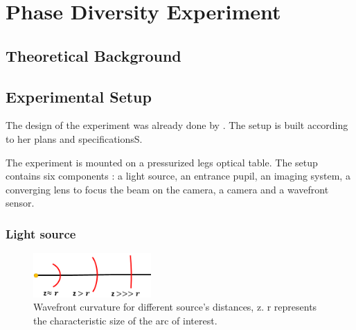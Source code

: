 \chapter{Phase Diversity Experiment} 

\label{PDExp}


\section{Theoretical Background}




\section{Experimental Setup}

The design of the experiment was already done by \citet{Bouxin_PDM}.  The setup is built according to her plans and specificationsS.

The experiment is mounted on a pressurized legs optical table. The setup contains six components : a light source, an entrance pupil, an imaging system, a converging lens to focus the beam on the camera, a camera and a wavefront sensor.

\subsection{Light source}

\begin{figure}
\centering
\includegraphics[width=0.4\textwidth]{Figures/WFdistantSource.PNG}
\decoRulewrapFig
\caption[Wavefront curvature]{Wavefront curvature for different source's distances, z. r represents the characteristic size of the arc of interest.}
\label{fig:WFdistantSource}
\end{figure}

